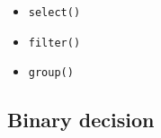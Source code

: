 \begin{itemize}
  \begin{itemize}
  \tightlist
  \item
    \texttt{s\allowbreak{}e\allowbreak{}l\allowbreak{}e\allowbreak{}c\allowbreak{}t\allowbreak{}(\allowbreak{})}
  \item
    \texttt{f\allowbreak{}i\allowbreak{}l\allowbreak{}t\allowbreak{}e\allowbreak{}r\allowbreak{}(\allowbreak{})}
  \item
    \texttt{g\allowbreak{}r\allowbreak{}o\allowbreak{}u\allowbreak{}p\allowbreak{}(\allowbreak{})}
  \end{itemize}
\end{itemize}

\subsection{Binary decision}\label{record-019-binary-decision}

